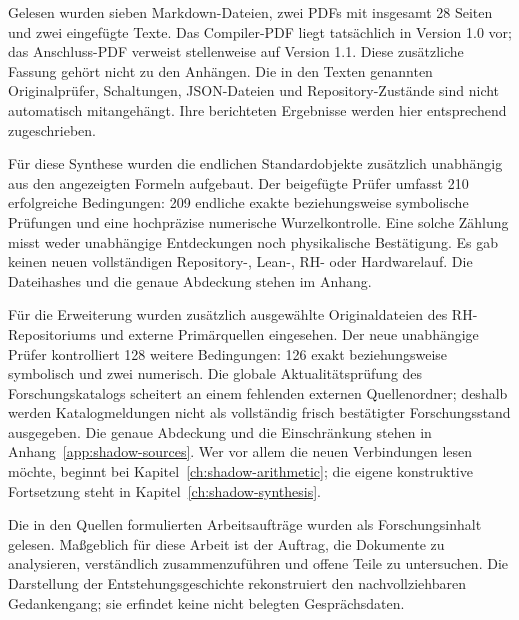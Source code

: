 \documentclass[11pt,a4paper,oneside,parskip=half,headings=normal]{scrreprt}
\begin{document}
Gelesen wurden sieben Markdown-Dateien, zwei PDFs mit insgesamt 28 Seiten und zwei eingefügte Texte. Das Compiler-PDF liegt tatsächlich in Version 1.0 vor; das Anschluss-PDF verweist stellenweise auf Version 1.1. Diese zusätzliche Fassung gehört nicht zu den Anhängen. Die in den Texten genannten Originalprüfer, Schaltungen, JSON-Dateien und Repository-Zustände sind nicht automatisch mitangehängt. Ihre berichteten Ergebnisse werden hier entsprechend zugeschrieben.

Für diese Synthese wurden die endlichen Standardobjekte zusätzlich unabhängig aus den angezeigten Formeln aufgebaut. Der beigefügte Prüfer umfasst 210 erfolgreiche Bedingungen: 209 endliche exakte beziehungsweise symbolische Prüfungen und eine hochpräzise numerische Wurzelkontrolle. Eine solche Zählung misst weder unabhängige Entdeckungen noch physikalische Bestätigung. Es gab keinen neuen vollständigen Repository-, Lean-, RH- oder Hardwarelauf. Die Dateihashes und die genaue Abdeckung stehen im Anhang.

Für die Erweiterung wurden zusätzlich ausgewählte Originaldateien des RH-Repositoriums und externe Primärquellen eingesehen. Der neue unabhängige Prüfer kontrolliert 128 weitere Bedingungen: 126 exakt beziehungsweise symbolisch und zwei numerisch. Die globale Aktualitätsprüfung des Forschungskatalogs scheitert an einem fehlenden externen Quellenordner; deshalb werden Katalogmeldungen nicht als vollständig frisch bestätigter Forschungsstand ausgegeben. Die genaue Abdeckung und die Einschränkung stehen in Anhang~\ref{app:shadow-sources}. Wer vor allem die neuen Verbindungen lesen möchte, beginnt bei Kapitel~\ref{ch:shadow-arithmetic}; die eigene konstruktive Fortsetzung steht in Kapitel~\ref{ch:shadow-synthesis}.

Die in den Quellen formulierten Arbeitsaufträge wurden als Forschungsinhalt gelesen. Maßgeblich für diese Arbeit ist der Auftrag, die Dokumente zu analysieren, verständlich zusammenzuführen und offene Teile zu untersuchen. Die Darstellung der Entstehungsgeschichte rekonstruiert den nachvollziehbaren Gedankengang; sie erfindet keine nicht belegten Gesprächsdaten.

\tableofcontents
\clearpage
{}





















\appendix



\end{document}
